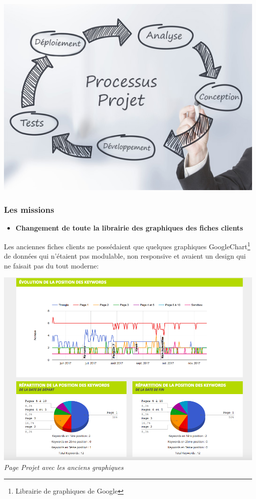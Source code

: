 \documentclass[12pt]{article}
\begin{document}
\vspace{1cm}

\begin{center} \includegraphics[scale = 0.7]{processusProjet.jpg} \end{center}
\vspace{1cm}
\newpage

\subsubsection{Les missions}

\begin{itemize}
\item \textbf{Changement de toute la librairie des graphiques des fiches clients}		
\end{itemize}
	 	Les anciennes fiches clients ne possédaient que quelques graphiques GoogleChart\footnote{Librairie de graphiques de Google} de données qui n'étaient pas modulable, non  responsive et avaient un design qui ne faisait pas du tout moderne:

\begin{center}
 \includegraphics[width = 15cm]{projetData2.png}
    \textit{Page Projet avec les anciens graphiques}
\end{center}
		
\end{document}

